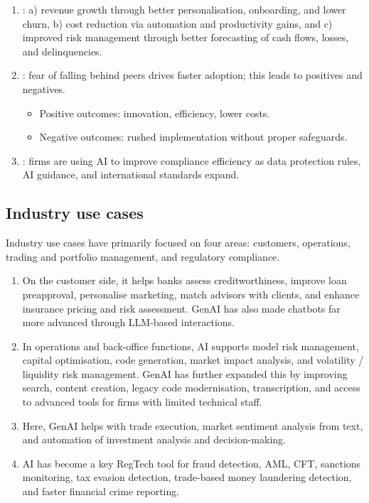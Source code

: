 \begin{enumerate}
\item {}: a) revenue growth through better personalisation, onboarding, and
lower churn, b) cost reduction via automation and productivity gains, and c) improved risk
management through better forecasting of cash flows, losses, and delinquencies.
\item {}: fear of falling behind peers drives faster adoption; this leads to
positives and negatives.
  \begin{itemize}
  \item Positive outcomes: innovation, efficiency, lower costs.
  \item Negative outcomes: rushed implementation without proper safeguards.
  \end{itemize}
\item {}: firms are using AI to improve compliance efficiency as data
protection rules, AI guidance, and international standards expand.
\end{enumerate}


\subsection*{Industry use cases}

Industry use cases have primarily focused on four areas: customers, operations, trading and
portfolio management, and regulatory compliance.

\begin{enumerate}
\item {} On the customer side, it helps banks assess
creditworthiness, improve loan preapproval, personalise marketing, match advisors with
clients, and enhance insurance pricing and risk assessment. GenAI has also made chatbots far
more advanced through LLM-based interactions.
\item {} In operations and back-office functions, AI
supports model risk management, capital optimisation, code generation, market impact
analysis, and volatility / liquidity risk management. GenAI has further expanded this by
improving search, content creation, legacy code modernisation, transcription, and access to
advanced tools for firms with limited technical staff.
\item {} Here, GenAI helps with trade execution, market
sentiment analysis from text, and automation of investment analysis and decision-making.
\item {} AI has become a key RegTech tool for fraud detection,
AML, CFT, sanctions monitoring, tax evasion detection, trade-based money laundering
detection, and faster financial crime reporting.
\end{enumerate}

